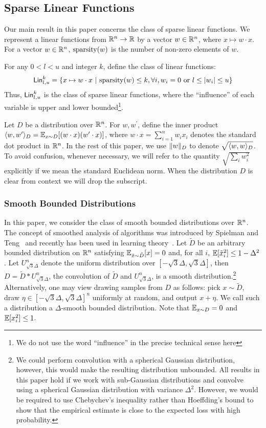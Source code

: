 \subsection{Sparse Linear Functions} 

Our main result in this paper concerns the class of sparse linear functions.  We
represent a linear functions from $\mathbb{R}^n \rightarrow \mathbb{R}$ by a vector $w
\in \mathbb{R}^n$, where $x \mapsto w \cdot x$.  For a vector $w \in \mathbb{R}^n$,
$\mathrm{sparsity}(w)$ is the number of non-zero elements of $w$.

For any $0 < l < u$ and integer $k$, define the class of linear functions:
\[
\mathsf{Lin}^k_{l, u} = \{ x \mapsto w \cdot x ~|~ \mathrm{sparsity}(w) \leq k, \forall i,
w_i = 0 \mbox{ or } l \leq |w_i| \leq u \}
\]
Thus, $\mathsf{Lin}^k_{l, u}$ is the class of sparse linear functions, where the
``influence'' of each variable is upper and lower bounded\footnote{We do not use
the word ``influence'' in the precise technical sense here}.

Let $D$ be a distribution over $\mathbb{R}^n$. For $w, w^\prime$, define the inner
product $\langle w, w^\prime \rangle_D = \mathbb{E}_{x \sim D}[(w \cdot x) (w^\prime \cdot x)]$,
where $w \cdot x = \sum_{i = 1}^n w_i x_i$ denotes the standard dot product
in $\mathbb{R}^n$. In the rest of this paper, we use $\Vert w \Vert_D$ to denote
$\sqrt{\langle w, w \rangle_D}$. To avoid confusion, whenever necessary, we
will refer to the quantity $\sqrt{\sum_{i} w_i^2}$ explicitly if we mean the standard
Euclidean norm. When the distribution $D$ is clear from context we will drop
the subscript.

\subsubsection*{Smooth Bounded Distributions}

In this paper, we consider the class of smooth bounded distributions over
$\mathbb{R}^n$. The concept of smoothed analysis of algorithms was introduced by
Spielman and Teng~\cite{ST:2001} and recently has been used in learning
theory~\cite{KST:2009,KKM:2013}.  Let $\tilde{D}$ be an arbitrary bounded
distribution on $\mathbb{R}^n$ satisfying $\mathbb{E}_{\tilde{x} \sim \tilde{D}}[x]=0$ and,
for all $i$, $\mathbb{E}[\tilde{x}_i^2] \leq 1 - \Delta^2$.  Let
$U^n_{\sqrt{3}\Delta}$ denote the uniform distribution over $[-\sqrt{3} \Delta,
\sqrt{3}\Delta]$, then $D = \tilde{D}* U^n_{\sqrt{3} \Delta}$, the
convolution of $\tilde{D}$ and $U^n_{\sqrt{3}\Delta}$, is a smooth
distribution.\footnote{We could perform convolution with a spherical
Gaussian distribution, however, this would make the resulting distribution
unbounded. All results in this paper hold if we work with sub-Gaussian
distributions and convolve using a spherical Gaussian distribution with variance
$\Delta^2$. However, we would be required to use Chebychev's inequality
rather than Hoeffding's bound to show that the empirical estimate is close to
the expected loss with high probability.} Alternatively, one may view drawing
samples from $D$ as follows: pick $x \sim \tilde{D}$, draw $\eta \in [-\sqrt{3}
\Delta, \sqrt{3} \Delta]^n$ uniformly at random, and output $x + \eta$. We call
such a distribution a $\Delta$-smooth bounded distribution. Note that $\mathbb{E}_{x
\sim D} = 0$ and $\mathbb{E}[x_i^2] \leq 1$.

